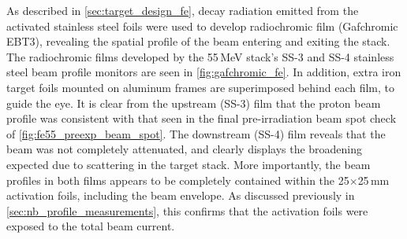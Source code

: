 As described in \autoref{sec:target_design_fe}, decay radiation emitted from the activated stainless steel foils were used to develop radiochromic film (Gafchromic EBT3), revealing the spatial profile of the beam entering and exiting the stack.
% 
% 
% 
% 
% 
% 
% 
The radiochromic films developed by the 55\,MeV stack's SS-3 and SS-4 stainless steel beam profile monitors are seen in \autoref{fig:gafchromic_fe}.
In addition, extra iron target foils mounted on  aluminum frames are superimposed behind each film, to guide the eye.
It is clear from the upstream (SS-3) film that the proton beam profile was consistent with that seen in the final pre-irradiation beam spot check of  \autoref{fig:fe55_preexp_beam_spot}.
The downstream (SS-4) film  reveals that the beam was not completely attenuated,  
and clearly displays the  broadening expected due to scattering in the target stack. 
More importantly, the beam profiles in both films appears to be completely contained within the 25$\times$25\,mm activation foils, including the beam envelope.
As discussed previously in \autoref{sec:nb_profile_measurements}, this confirms that the activation foils were exposed to  the total beam current.


